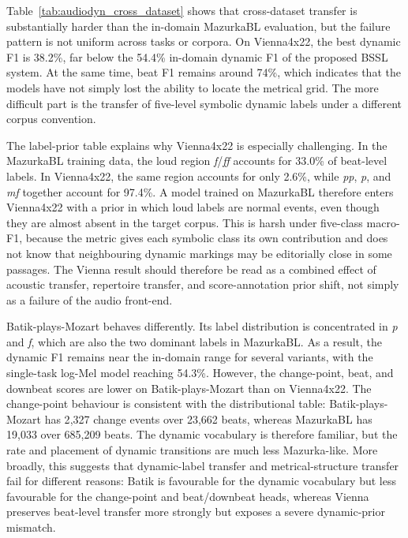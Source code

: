 Table~\ref{tab:audiodyn_cross_dataset} shows that cross-dataset transfer is substantially harder than the in-domain MazurkaBL evaluation, but the failure pattern is not uniform across tasks or corpora. On Vienna4x22, the best dynamic F1 is 38.2\%, far below the 54.4\% in-domain dynamic F1 of the proposed BSSL system. At the same time, beat F1 remains around 74\%, which indicates that the models have not simply lost the ability to locate the metrical grid. The more difficult part is the transfer of five-level symbolic dynamic labels under a different corpus convention.

The label-prior table explains why Vienna4x22 is especially challenging. In the MazurkaBL training data, the loud region \textit{f}/\textit{ff} accounts for 33.0\% of beat-level labels. In Vienna4x22, the same region accounts for only 2.6\%, while \textit{pp}, \textit{p}, and \textit{mf} together account for 97.4\%. A model trained on MazurkaBL therefore enters Vienna4x22 with a prior in which loud labels are normal events, even though they are almost absent in the target corpus. This is harsh under five-class macro-F1, because the metric gives each symbolic class its own contribution and does not know that neighbouring dynamic markings may be editorially close in some passages. The Vienna result should therefore be read as a combined effect of acoustic transfer, repertoire transfer, and score-annotation prior shift, not simply as a failure of the audio front-end.

Batik-plays-Mozart behaves differently. Its label distribution is concentrated in \textit{p} and \textit{f}, which are also the two dominant labels in MazurkaBL. As a result, the dynamic F1 remains near the in-domain range for several variants, with the single-task log-Mel model reaching 54.3\%. However, the change-point, beat, and downbeat scores are lower on Batik-plays-Mozart than on Vienna4x22. The change-point behaviour is consistent with the distributional table: Batik-plays-Mozart has 2{,}327 change events over 23{,}662 beats, whereas MazurkaBL has 19{,}033 over 685{,}209 beats. The dynamic vocabulary is therefore familiar, but the rate and placement of dynamic transitions are much less Mazurka-like. More broadly, this suggests that dynamic-label transfer and metrical-structure transfer fail for different reasons: Batik is favourable for the dynamic vocabulary but less favourable for the change-point and beat/downbeat heads, whereas Vienna preserves beat-level transfer more strongly but exposes a severe dynamic-prior mismatch.

